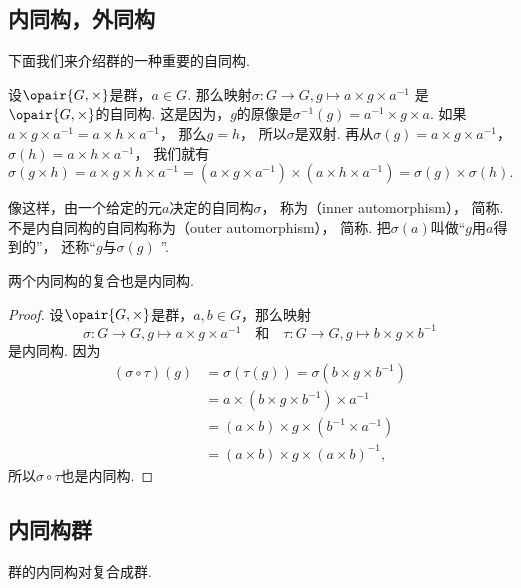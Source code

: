 \subsection{内同构，外同构}
下面我们来介绍群的一种重要的自同构.

设\(\opair{G,\times}\)是群，\(a\in G\).
那么映射\(\sigma\colon G\to G, g\mapsto a\times g\times a^{-1}\)
是\(\opair{G,\times}\)的自同构.
这是因为，\(g\)的原像是\(\sigma^{-1}(g)=a^{-1}\times g\times a\).
如果\(a\times g\times a^{-1} = a\times h\times a^{-1}\)，
那么\(g=h\)，
所以\(\sigma\)是双射.
再从\(\sigma(g)=a\times g\times a^{-1}\)，
\(\sigma(h)=a\times h\times a^{-1}\)，
我们就有\[
	\sigma(g\times h)
	= a \times g \times h \times a^{-1}
	= (a \times g \times a^{-1}) \times (a \times h \times a^{-1})
	= \sigma(g) \times \sigma(h).
\]

像这样，由一个给定的元\(a\)决定的自同构\(\sigma\)，
称为（inner automorphism），
简称.
不是内自同构的自同构称为（outer automorphism），
简称.
把\(\sigma(a)\)叫做“\(g\)用\(a\)得到的”，
还称“\(g\)与\(\sigma(g)\) ”.

\begin{theorem}
两个内同构的复合也是内同构.
\begin{proof}
设\(\opair{G,\times}\)是群，\(a,b\in G\)，那么映射\[
	\sigma\colon G\to G, g\mapsto a\times g\times a^{-1}
	\quad\text{和}\quad
	\tau\colon G\to G, g\mapsto b\times g\times b^{-1}
\]是内同构.
因为\begin{align*}
	(\sigma\circ\tau)(g)
	&=\sigma(\tau(g))
	=\sigma(b\times g\times b^{-1}) \\
	&=a\times(b\times g\times b^{-1})\times a^{-1} \\
	&=(a\times b)\times g\times(b^{-1}\times a^{-1}) \\
	&=(a\times b)\times g\times(a\times b)^{-1},
\end{align*}
所以\(\sigma\circ\tau\)也是内同构.
\end{proof}
\end{theorem}

\subsection{内同构群}
\begin{theorem}
群的内同构对复合成群.
\end{theorem}

